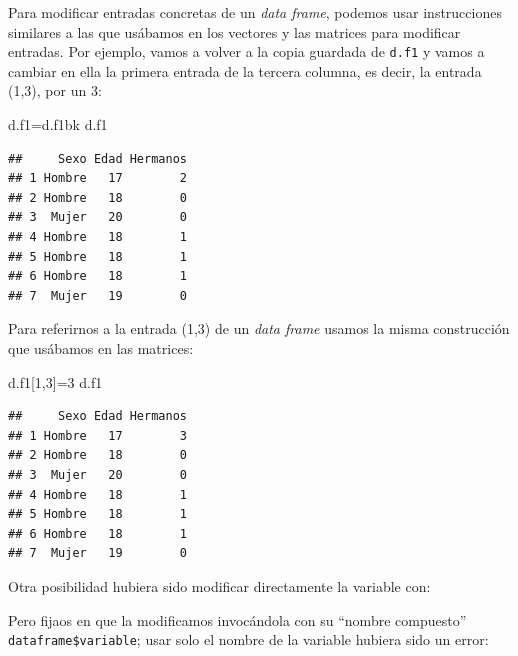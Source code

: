 \documentclass[]{book}
\newenvironment{Shaded}{\begin{snugshade}}{\end{snugshade}}
\newcommand{\DecValTok}[1]{\textcolor[rgb]{0.00,0.00,0.81}{#1}}
\newcommand{\NormalTok}[1]{#1}
\newcommand{\OperatorTok}[1]{\textcolor[rgb]{0.81,0.36,0.00}{\textbf{#1}}}
\theoremstyle{definition}
\theoremstyle{definition}
\theoremstyle{definition}
\theoremstyle{remark}
\begin{document}
Para modificar entradas concretas de un \emph{data frame}, podemos usar instrucciones similares a las que usábamos en los vectores y las matrices para modificar entradas. Por ejemplo, vamos a volver a la copia guardada de \texttt{d.f1} y vamos a cambiar en ella la primera entrada de la tercera columna, es decir, la entrada (1,3), por un 3:

\begin{Shaded}
\begin{Highlighting}[]
\NormalTok{d.f1=d.f1bk }
\NormalTok{d.f1}
\end{Highlighting}
\end{Shaded}

\begin{verbatim}
##     Sexo Edad Hermanos
## 1 Hombre   17        2
## 2 Hombre   18        0
## 3  Mujer   20        0
## 4 Hombre   18        1
## 5 Hombre   18        1
## 6 Hombre   18        1
## 7  Mujer   19        0
\end{verbatim}

Para referirnos a la entrada (1,3) de un \emph{data frame} usamos la misma construcción que usábamos en las matrices:

\begin{Shaded}
\begin{Highlighting}[]
\NormalTok{d.f1[}\DecValTok{1}\NormalTok{,}\DecValTok{3}\NormalTok{]=}\DecValTok{3}
\NormalTok{d.f1}
\end{Highlighting}
\end{Shaded}

\begin{verbatim}
##     Sexo Edad Hermanos
## 1 Hombre   17        3
## 2 Hombre   18        0
## 3  Mujer   20        0
## 4 Hombre   18        1
## 5 Hombre   18        1
## 6 Hombre   18        1
## 7  Mujer   19        0
\end{verbatim}

Otra posibilidad hubiera sido modificar directamente la variable con:

\begin{Shaded}
\end{Shaded}

Pero fijaos en que la modificamos invocándola con su ``nombre compuesto'' \texttt{dataframe\$variable}; usar solo el nombre de la variable hubiera sido un error:
\end{document}
